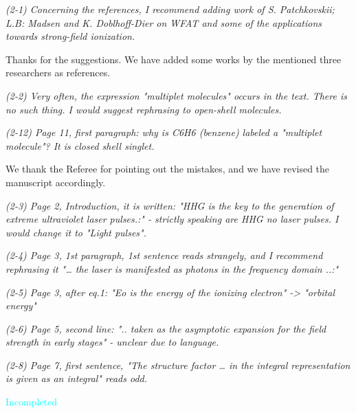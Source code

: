 \documentclass[a4paper,11pt]{article}
\newcommand{\cyan}[1]{\textcolor{cyan}{#1}}
\begin{document}

\textit{
(2-1)
Concerning the references, I recommend adding work of S. Patchkovskii; L.B: Madsen and K. Doblhoff-Dier on WFAT and some of the applications towards strong-field ionization.
}

\vspace{1em}

Thanks for the suggestions.
We have added some works by the mentioned three researchers as references.

\vspace{2em}


\textit{
(2-2)
Very often, the expression "multiplet molecules" occurs in the text. There is no such thing. I would suggest rephrasing to open-shell molecules.
}

\textit{
(2-12)
Page 11, first paragraph: why is C6H6 (benzene) labeled a "multiplet molecule"? It is closed shell singlet.
}

\vspace{1em}

We thank the Referee for pointing out the mistakes, and we have revised the manuscript accordingly.

\vspace{2em}


\textit{
(2-3)
Page 2, Introduction, it is written: "HHG is the key to the generation of extreme ultraviolet laser pulses.:" - strictly speaking are HHG no laser pulses. I would change it to "Light pulses".
}

\textit{
(2-4)
Page 3, 1st paragraph, 1st sentence reads strangely, and I recommend rephrasing it "… the laser is manifested as photons in the frequency domain ..:"
}

\textit{
(2-5)
Page 3, after eq.1: "Eo is the energy of the ionizing electron" -> "orbital energy"
}

\textit{
(2-6)
Page 5, second line: ".. taken as the asymptotic expansion for the field strength in early stages" - unclear due to language.
}

\textit{
(2-8)
Page 7, first sentence, "The structure factor … in the integral representation is given as an integral" reads odd.
}

\vspace{1em}

\cyan{Incompleted}

\vspace{2em}
\end{document}
